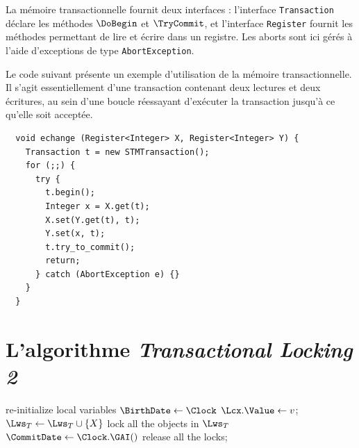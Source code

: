 La mémoire transactionnelle fournit deux interfaces :
l'interface \lstinline{Transaction} déclare les méthodes $\DoBegin$ et $\TryCommit$,
et l'interface \lstinline{Register} fournit les méthodes permettant de
lire et écrire dans un registre. 
Les aborts sont ici gérés à l'aide d'exceptions de type \lstinline{AbortException}.

Le code suivant présente un exemple d'utilisation de la mémoire transactionnelle.
Il s'agit essentiellement d'une transaction contenant deux lectures et deux écritures,
au sein d'une boucle réessayant d'exécuter la transaction jusqu'à ce qu'elle soit acceptée.

\begin{lstlisting}
  void echange (Register<Integer> X, Register<Integer> Y) {
    Transaction t = new STMTransaction();
    for (;;) {
      try {
        t.begin();
        Integer x = X.get(t);
        X.set(Y.get(t), t);
        Y.set(x, t);
        t.try_to_commit();
        return;
      } catch (AbortException e) {}
    }
  }
\end{lstlisting}

\pagebreak
\section{L'algorithme \emph{Transactional Locking 2}}

\begin{algorithm}[t]
   {
    re-initialize local variables\;
    $\BirthDate \leftarrow \Clock$\;
  }
   {
    $\Lcx.\Value \leftarrow v$; 
    $\Lws_T\leftarrow \Lws_T \cup \{X\}$\;
  }
   {
  }
   {
    lock all the objects in $\Lws_T$\;
    $\CommitDate \leftarrow \Clock.\GAI()$\label{al:incr}\;
    release all the locks;
  }
  \caption{Algorithme TL2}
  \label{algo:TL2}
\end{algorithm}


